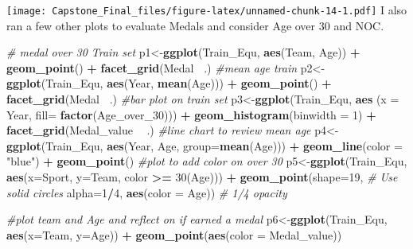 \documentclass[]{article}
\newenvironment{Shaded}{\begin{snugshade}}{\end{snugshade}}
\newcommand{\KeywordTok}[1]{\textcolor[rgb]{0.13,0.29,0.53}{\textbf{#1}}}
\newcommand{\DataTypeTok}[1]{\textcolor[rgb]{0.13,0.29,0.53}{#1}}
\newcommand{\DecValTok}[1]{\textcolor[rgb]{0.00,0.00,0.81}{#1}}
\newcommand{\StringTok}[1]{\textcolor[rgb]{0.31,0.60,0.02}{#1}}
\newcommand{\CommentTok}[1]{\textcolor[rgb]{0.56,0.35,0.01}{\textit{#1}}}
\newcommand{\OperatorTok}[1]{\textcolor[rgb]{0.81,0.36,0.00}{\textbf{#1}}}
\newcommand{\NormalTok}[1]{#1}
\begin{document}
\texttt{[image: Capstone\_Final\_files/figure-latex/unnamed-chunk-14-1.pdf]}
I also ran a few other plots to evaluate Medals and consider Age over 30
and NOC.

\begin{Shaded}
\begin{Highlighting}[]
\CommentTok{# medal over 30 Train set}
\NormalTok{p1<-}\KeywordTok{ggplot}\NormalTok{(Train_Equ, }\KeywordTok{aes}\NormalTok{(Team, Age)) }\OperatorTok{+}
\StringTok{  }\KeywordTok{geom_point}\NormalTok{() }\OperatorTok{+}
\StringTok{  }\KeywordTok{facet_grid}\NormalTok{(Medal }\OperatorTok{~}\NormalTok{.)}
\CommentTok{#mean age train}
\NormalTok{p2<-}\KeywordTok{ggplot}\NormalTok{(Train_Equ, }\KeywordTok{aes}\NormalTok{(Year, }\KeywordTok{mean}\NormalTok{(Age))) }\OperatorTok{+}
\StringTok{  }\KeywordTok{geom_point}\NormalTok{() }\OperatorTok{+}
\StringTok{  }\KeywordTok{facet_grid}\NormalTok{(Medal }\OperatorTok{~}\NormalTok{.)}
\CommentTok{#bar plot on train set}
\NormalTok{p3<-}\KeywordTok{ggplot}\NormalTok{(Train_Equ, }\KeywordTok{aes}\NormalTok{ (}\DataTypeTok{x =}\NormalTok{ Year, }\DataTypeTok{fill=} \KeywordTok{factor}\NormalTok{(Age_over_}\DecValTok{30}\NormalTok{))) }\OperatorTok{+}
\StringTok{  }\KeywordTok{geom_histogram}\NormalTok{(}\DataTypeTok{binwidth =} \DecValTok{1}\NormalTok{) }\OperatorTok{+}
\StringTok{  }\KeywordTok{facet_grid}\NormalTok{(Medal_value }\OperatorTok{~}\StringTok{ }\NormalTok{.)}
\CommentTok{#line chart to review mean age}
\NormalTok{p4<-}\KeywordTok{ggplot}\NormalTok{(Train_Equ, }\KeywordTok{aes}\NormalTok{(Year, Age, }\DataTypeTok{group=}\KeywordTok{mean}\NormalTok{(Age))) }\OperatorTok{+}
\StringTok{  }\KeywordTok{geom_line}\NormalTok{(}\DataTypeTok{color =} \StringTok{"blue"}\NormalTok{) }\OperatorTok{+}
\StringTok{  }\KeywordTok{geom_point}\NormalTok{()}
\CommentTok{#plot to add color on over 30}
\NormalTok{p5<-}\KeywordTok{ggplot}\NormalTok{(Train_Equ, }\KeywordTok{aes}\NormalTok{(}\DataTypeTok{x=}\NormalTok{Sport, }\DataTypeTok{y=}\NormalTok{Team, color }\OperatorTok{>=}\StringTok{ }\DecValTok{30}\NormalTok{(Age))) }\OperatorTok{+}
\StringTok{  }\KeywordTok{geom_point}\NormalTok{(}\DataTypeTok{shape=}\DecValTok{19}\NormalTok{,      }\CommentTok{# Use solid circles}
             \DataTypeTok{alpha=}\DecValTok{1}\OperatorTok{/}\DecValTok{4}\NormalTok{, }\KeywordTok{aes}\NormalTok{(}\DataTypeTok{color =}\NormalTok{ Age))     }\CommentTok{# 1/4 opacity}

\CommentTok{#plot team and Age and reflect on if earned a medal}
\NormalTok{p6<-}\KeywordTok{ggplot}\NormalTok{(Train_Equ, }\KeywordTok{aes}\NormalTok{(}\DataTypeTok{x=}\NormalTok{Team, }\DataTypeTok{y=}\NormalTok{Age)) }\OperatorTok{+}
\StringTok{  }\KeywordTok{geom_point}\NormalTok{(}\KeywordTok{aes}\NormalTok{(}\DataTypeTok{color =}\NormalTok{ Medal_value))}


\end{Highlighting}
\end{Shaded}
\end{document}
